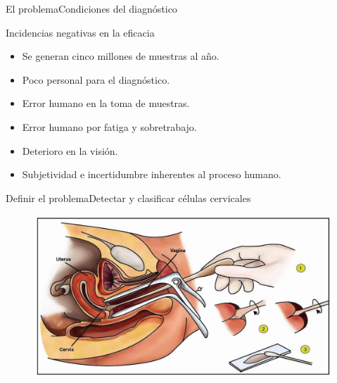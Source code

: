 \documentclass[aspectratio=169,10pt]{beamer}
\begin{document}
\begin{frame}{El problema}{Condiciones del diagnóstico}

  \begin{alertblock}{Incidencias negativas en la eficacia}{
      \begin{itemize}
        \item Se generan cinco millones de muestras al año.
        \item Poco personal para el diagnóstico.
        \item Error humano en la toma de muestras.
        \item Error humano por fatiga y sobretrabajo.
        \item Deterioro en la visión.
        \item Subjetividad e incertidumbre inherentes al proceso humano.
      \end{itemize}
    }
  \end{alertblock}
\end{frame}

\begin{frame}{Definir el problema}{Detectar y clasificar células cervicales}
  \begin{figure}[]
    \centering
    \includegraphics[height=0.95\textheight]{papsmear.jpg}
  \end{figure}
\end{frame}
\end{document}
